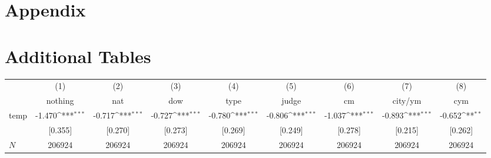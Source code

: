 \documentclass[11pt]{article}
\begin{document}
	\begin{subappendices}
		\appendix
		
		\section*{Appendix}\label{Appendix}
		\singlespacing
		\section{Additional Tables}\label{ASec:xxxxx}
		

		
		\begin{center}
			 \label{tab:title} 
			{
				{
					\def\sym#1{\ifmmode^{#1}\else\(^{#1}\)\fi}
					\begin{tabular}{l*{8}{c}}
						\hline\hline
						&\multicolumn{1}{c}{(1)}&\multicolumn{1}{c}{(2)}&\multicolumn{1}{c}{(3)}&\multicolumn{1}{c}{(4)}&\multicolumn{1}{c}{(5)}&\multicolumn{1}{c}{(6)}&\multicolumn{1}{c}{(7)}&\multicolumn{1}{c}{(8)}\\
						&\multicolumn{1}{c}{nothing}&\multicolumn{1}{c}{nat}&\multicolumn{1}{c}{dow}&\multicolumn{1}{c}{type}&\multicolumn{1}{c}{judge}&\multicolumn{1}{c}{cm}&\multicolumn{1}{c}{city/ym}&\multicolumn{1}{c}{cym}\\
						\hline
						temp   &      -1.470\sym{***}&      -0.717\sym{***}&      -0.727\sym{***}&      -0.780\sym{***}&      -0.806\sym{***}&      -1.037\sym{***}&      -0.893\sym{***} &      -0.652\sym{**}   \\
						&     [0.355]         &     [0.270]         &     [0.273]         &     [0.269]         &     [0.249]         &     [0.278]         &     [0.215]        &     [0.262]  \\
						\hline
						\(N\)       &      206924         &      206924         &      206924         &      206924         &      206924         &      206924         &      206924 &      206924      \\
						\hline\hline
					\end{tabular}
				}
			}
		\end{center}			
		\begin{center}	
			

\end{center}
\end{subappendices}
\end{document}
